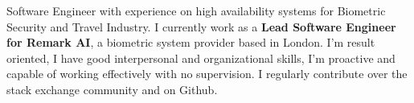 

\begin{cvparagraph}

Software Engineer with experience on high availability systems for Biometric Security and Travel Industry.
I currently work as a \textbf{Lead Software Engineer for Remark AI}, a biometric system provider based in London.
I’m result oriented, I have good interpersonal and organizational skills, I'm proactive and capable of working effectively with
no supervision.
I regularly contribute over the stack exchange community and on Github.
\end{cvparagraph}
